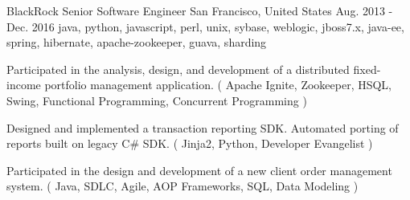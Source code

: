 \cventry
    {BlackRock} %
    {Senior Software Engineer} %
    {San Francisco, United States} %
    {Aug. 2013 - Dec. 2016} %
    {java, python, javascript, perl, unix, sybase, weblogic, jboss7.x, java-ee, spring, hibernate, apache-zookeeper, guava, sharding}%
    {
    \begin{cvitems} %
        \item { Participated in the analysis, design, and development of a distributed fixed-income portfolio management application. ( Apache Ignite, Zookeeper, HSQL, Swing, Functional Programming, Concurrent Programming )}
        \item { Designed and implemented a transaction reporting SDK. Automated porting of reports built on legacy C\# SDK. ( Jinja2, Python, Developer Evangelist )}
        \item { Participated in the design and development of a new client order management system. ( Java, SDLC, Agile, AOP Frameworks, SQL, Data Modeling )}
    \end{cvitems}
    }